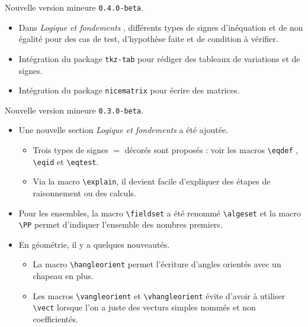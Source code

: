 \documentclass[12pt,a4paper]{article}
\begin{document}
\begin{description}[leftmargin=1em]

    \item[2019-09-06]  Nouvelle version mineure \verb+0.4.0-beta+.
    \begin{itemize}
        \item Dans \emph{\og Logique et fondements \fg}, différents types de signes d'inéquation et de non égalité pour des cas de test, d'hypothèse faite et de condition à vérifier.

        \item Intégration du package \verb+tkz-tab+ pour rédiger des tableaux de variations et de signes.

        \item Intégration du package \verb+nicematrix+ pour écrire des matrices.
    \end{itemize}


    \item[2019-07-23] Nouvelle version mineure \verb+0.3.0-beta+.
    \begin{itemize}
        \item Une nouvelle section \emph{\og Logique et fondements \fg} a été ajoutée.
        \begin{itemize}
            \item Trois types de signes $=$ décorés sont proposés : voir les macros \verb+\eqdef+ , \verb+\eqid+ et \verb+\eqtest+.

            \item Via la macro \verb+\explain+, il devient facile d'expliquer des étapes de raisonnement ou des calculs.
        \end{itemize}

        \item Pour les ensembles, la macro \verb+\fieldset+ a été renommé \verb+\algeset+ et la macro \verb+\PP+ permet d'indiquer l'ensemble des nombres premiers.

        \item En géométrie, il y a quelques nouveautés.
        \begin{itemize}
            \item La macro \verb+\hangleorient+ permet l'écriture d'angles orientés avec un chapeau en plus.

            \item Les macros \verb+\vangleorient+ et \verb+\vhangleorient+ évite d'avoir à utiliser \verb+\vect+ lorsque l'on a juste des vecturs simples nommés et non coefficientés.


\end{itemize}
\end{itemize}
\end{description}
\end{document}
